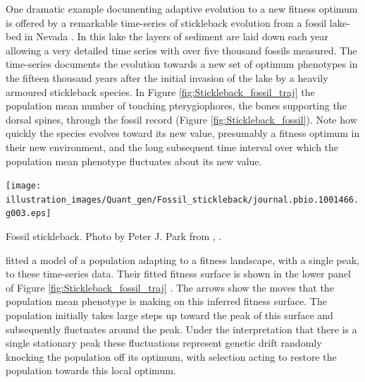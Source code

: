One dramatic example documenting adaptive evolution to a new
fitness optimum is offered by a remarkable time-series of
stickleback evolution from a fossil lake-bed in Nevada \citep{bell2006inferring}. In this lake
the layers of sediment are laid down each year allowing a very detailed
time series with over five thousand fossils measured. The time-series
documents the evolution towards a new set of optimum phenotypes in the
fifteen thousand years after the initial invasion of the lake by a
heavily armoured stickleback species. In Figure \ref{fig:Stickleback_fossil_traj} the population mean number of
touching pterygiophores, the bones supporting the dorsal spines,
through the fossil record (Figure \ref{fig:Stickleback_fossil}). Note how quickly the species evolves toward
its new value, presumably a fitness optimum in their new environment, and the long subsequent time interval over which
the population mean phenotype fluctuates about its new value.
\begin{marginfigure}
 \begin{center}
 \texttt{[image: illustration\_images/Quant\_gen/Fossil\_stickleback/journal.pbio.1001466.g003.eps]}
 \end{center}
 \caption{Fossil stickleback. Photo by Peter J. Park from \citet{losos2013evolutionary}, \PLOSccBY.} \label{fig:Stickleback_fossil}  
\end{marginfigure}

\citet{hunt2008evolution} fitted a model of a population adapting to a
fitness landscape, with a single peak, to these time-series data. Their fitted fitness
surface is shown in the lower panel of Figure \ref{fig:Stickleback_fossil_traj} . The arrows show the moves that the
population mean phenotype is making on this inferred fitness
surface. The population initially takes large steps up toward the peak
of this surface and subsequently fluctuates around the peak. Under the
interpretation that there is a single stationary peak these
fluctuations represent genetic drift randomly knocking the population
off its optimum, with selection acting to restore
the population towards this local optimum.


